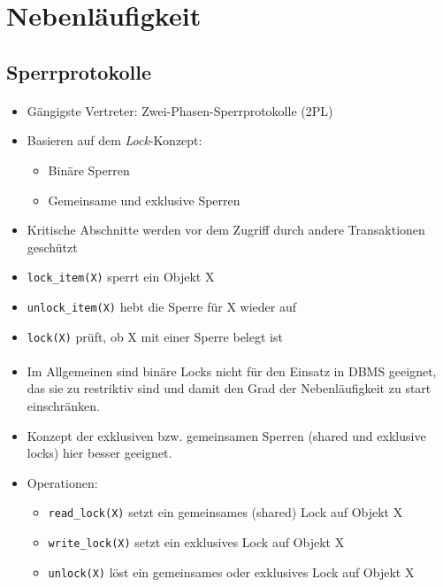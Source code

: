 %
%

\section{Nebenläufigkeit}
\subsection{Sperrprotokolle}

\begin{frame}{\insertsection}
	\framesubtitle{\insertsubsection}
\begin{itemize}
\item Gängigste Vertreter: Zwei-Phasen-Sperrprotokolle (2PL)
\item Basieren auf dem \textit{Lock}-Konzept:
\begin{itemize}
\item Binäre Sperren
\item Gemeinsame und exklusive Sperren 
\end{itemize}
\item Kritische Abschnitte werden vor dem Zugriff durch andere Transaktionen geschützt
\end{itemize}
\begin{itemize}
\item \texttt{lock\_item(X)} sperrt ein Objekt X
\item \texttt{unlock\_item(X)} hebt die Sperre für X wieder auf 
\item \texttt{lock(X)} prüft, ob X mit einer Sperre belegt ist
\end{itemize}
\end{frame}

\begin{frame}{\insertsection}
	\framesubtitle{\insertsubsection}
\begin{itemize}
\item Im Allgemeinen sind binäre Locks nicht für den Einsatz in DBMS geeignet, das sie zu restriktiv sind und damit den Grad der Nebenläufigkeit zu start einschränken.
\item Konzept der exklusiven bzw. gemeinsamen Sperren (shared und exklusive locks) hier besser geeignet. 
\item Operationen:
\begin{itemize}
\item \texttt{read\_lock(X)} setzt ein gemeinsames (shared) Lock auf Objekt X
\item \texttt{write\_lock(X)} setzt ein exklusives Lock auf Objekt X 
\item \texttt{unlock(X)} löst ein gemeinsames oder exklusives Lock auf Objekt X 
\end{itemize} 
\end{itemize}
\end{frame}

